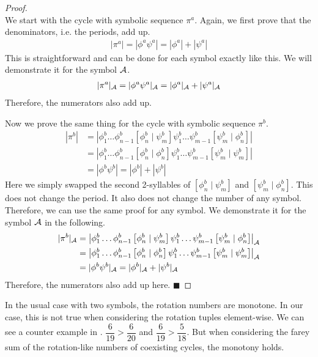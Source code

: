 \begin{proof} \phantom{x} \\
	We start with the cycle with symbolic sequence $\pi^a$.
	Again, we first prove that the denominators, i.e. the periods, add up.
	\begin{align*}
		|\pi^a| = |\phi^a\psi^a| = |\phi^a| + |\psi^a|
	\end{align*}
	This is straightforward and can be done for each symbol exactly like this.
	We will demonstrate it for the symbol $\mathcal{A}$.
	\begin{align*}
		|\pi^a|_{\mathcal{A}} = |\phi^a\psi^a|_{\mathcal{A}} = |\phi^a|_{\mathcal{A}} + |\psi^a|_{\mathcal{A}}
	\end{align*}
	Therefore, the numerators also add up.

	Now we prove the same thing for the cycle with symbolic sequence $\pi^b$.
	\begin{align*}
		|\pi^b| & = \left|\phi^b_1 \dots \phi^b_{n-1} \left[\phi^b_n \mid \psi^b_m\right] \psi^b_1 \dots \psi^b_{m-1} \left[\psi^b_m \mid \phi^b_n\right]\right| \\
		        & = \left|\phi^b_1 \dots \phi^b_{n-1} \left[\phi^b_n \mid \phi^b_n\right] \psi^b_1 \dots \psi^b_{m-1} \left[\psi^b_m \mid \psi^b_m\right]\right| \\
		        & = |\phi^b \psi^b| = |\phi^b| + |\psi^b|
	\end{align*}
	Here we simply swapped the second 2-syllables of $\left[\phi^b_n \mid \psi^b_m\right]$ and $\left[\psi^b_m \mid \phi^b_n\right]$.
	This does not change the period.
	It also does not change the number of any symbol.
	Therefore, we can use the same proof for any symbol.
	We demonstrate it for the symbol $\mathcal{A}$ in the following.
	\begin{align*}
		|\pi^b|_{\mathcal{A}} & = \left|\phi^b_1 \dots \phi^b_{n-1} \left[\phi^b_n \mid \psi^b_m\right] \psi^b_1 \dots \psi^b_{m-1} \left[\psi^b_m \mid \phi^b_n\right]\right|_{\mathcal{A}} \\
		           & = \left|\phi^b_1 \dots \phi^b_{n-1} \left[\phi^b_n \mid \phi^b_n\right] \psi^b_1 \dots \psi^b_{m-1} \left[\psi^b_m \mid \psi^b_m\right]\right|_{\mathcal{A}} \\
		           & = |\phi^b \psi^b|_{\mathcal{A}} = |\phi^b|_{\mathcal{A}} + |\psi^b|_{\mathcal{A}}
	\end{align*}
	Therefore, the numerators also add up here.
	\hfill $\blacksquare$
\end{proof}

In the usual case with two symbols, the rotation numbers are monotone.
In our case, this is not true when considering the rotation tuples element-wise.
We can see a counter example in .
$\dfrac{6}{19} > \dfrac{6}{20}$ and $\dfrac{6}{19} > \dfrac{5}{18}$.
But when considering the farey sum of the rotation-like numbers of coexisting cycles, the monotony holds.

